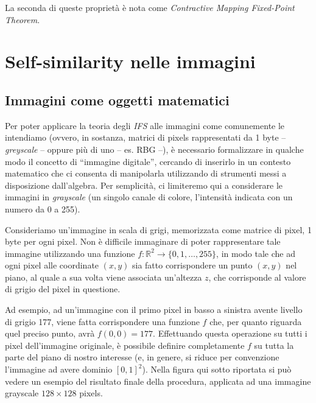 \documentclass[11pt,a4paper,appendixprefix=true,numbers=noenddot]{scrreprt}
\begin{document}
La seconda di queste proprietà è nota come \emph{Contractive Mapping Fixed-Point Theorem}.

\section{Self-similarity nelle immagini}

\subsection*{Immagini come oggetti matematici}

Per poter applicare la teoria degli \emph{IFS} alle immagini come comunemente le intendiamo (ovvero, in sostanza, matrici di pixels rappresentati  da 1 byte -- \emph{greyscale} -- oppure più di uno -- es. RBG --), è necessario formalizzare in qualche modo il concetto di ``immagine digitale'', cercando di inserirlo in un contesto matematico che ci consenta di manipolarla utilizzando di strumenti messi a disposizione dall'algebra. Per semplicità, ci limiteremo qui a considerare le immagini in \emph{grayscale} (un singolo canale di colore, l'intensità indicata con un numero da 0 a 255).

Consideriamo un'immagine in scala di grigi, memorizzata come matrice di pixel, 1 byte per ogni pixel. Non è difficile immaginare di poter rappresentare tale immagine utilizzando una funzione $f: \mathbb{R}^2 \rightarrow  \{0, 1, \ldots, 255 \}$, in modo tale che ad ogni pixel alle coordinate $(x, y)$ sia fatto corrispondere un punto $(x, y)$ nel piano, al quale a sua volta viene associata un'altezza $z$, che corrisponde al valore di grigio del pixel in questione. 

Ad esempio, ad un'immagine con il primo pixel in basso a sinistra avente livello di grigio 177, viene fatta corrispondere una funzione $f$ che, per quanto riguarda quel preciso punto, avrà $f(0,0) = 177$. Effettuando questa operazione su tutti i pixel dell'immagine originale, è possibile definire completamente $f$ su tutta la parte del piano di nostro interesse (e, in genere, si riduce per convenzione l'immagine ad avere dominio 
$[0, 1]^2$). Nella figura qui sotto riportata si può vedere un esempio del risultato finale della procedura, applicata ad una immagine grayscale $128 \times 128$ pixels.
\end{document}
